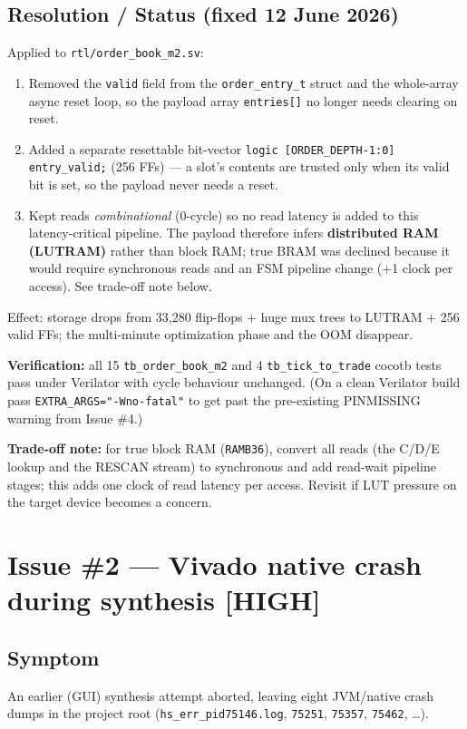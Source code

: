 \documentclass[11pt,a4paper]{article}
\newcommand{\sev}[1]{%
  \ifstrequal{#1}{HIGH}{\textcolor{sev-high}{\textbf{[HIGH]}}}{%
  \ifstrequal{#1}{MED}{\textcolor{sev-med}{\textbf{[MEDIUM]}}}{%
  \textcolor{sev-low}{\textbf{[LOW]}}}}}
\begin{document}
\subsection{Resolution / Status \textnormal{(\textbf{fixed} 12 June 2026)}}
Applied to \texttt{rtl/order\_book\_m2.sv}:
\begin{enumerate}[leftmargin=*]
  \item Removed the \texttt{valid} field from the \texttt{order\_entry\_t} struct
        and the whole-array async reset loop, so the payload array
        \texttt{entries[]} no longer needs clearing on reset.
  \item Added a separate resettable bit-vector
        \texttt{logic [ORDER\_DEPTH-1:0] entry\_valid;} (256 FFs) — a slot's
        contents are trusted only when its valid bit is set, so the payload
        never needs a reset.
  \item Kept reads \emph{combinational} (0-cycle) so no read latency is added to
        this latency-critical pipeline. The payload therefore infers
        \textbf{distributed RAM (LUTRAM)} rather than block RAM; true BRAM was
        declined because it would require synchronous reads and an FSM pipeline
        change (+1 clock per access). See trade-off note below.
\end{enumerate}
Effect: storage drops from 33{,}280 flip-flops + huge mux trees to LUTRAM
$+$ 256 valid FFs; the multi-minute optimization phase and the OOM disappear.

\textbf{Verification:} all 15 \texttt{tb\_order\_book\_m2} and 4
\texttt{tb\_tick\_to\_trade} cocotb tests pass under Verilator with cycle
behaviour unchanged. (On a clean Verilator build pass
\texttt{EXTRA\_ARGS="-Wno-fatal"} to get past the pre-existing PINMISSING
warning from Issue \#4.)

\textbf{Trade-off note:} for true block RAM (\texttt{RAMB36}), convert all reads
(the C/D/E lookup and the RESCAN stream) to synchronous and add read-wait
pipeline stages; this adds one clock of read latency per access. Revisit if LUT
pressure on the target device becomes a concern.

\section{Issue \#2 — Vivado native crash during synthesis \sev{HIGH}}

\subsection{Symptom}
An earlier (GUI) synthesis attempt aborted, leaving eight JVM/native crash dumps
in the project root (\texttt{hs\_err\_pid75146.log}, \texttt{75251},
\texttt{75357}, \texttt{75462}, \dots).
\end{document}
